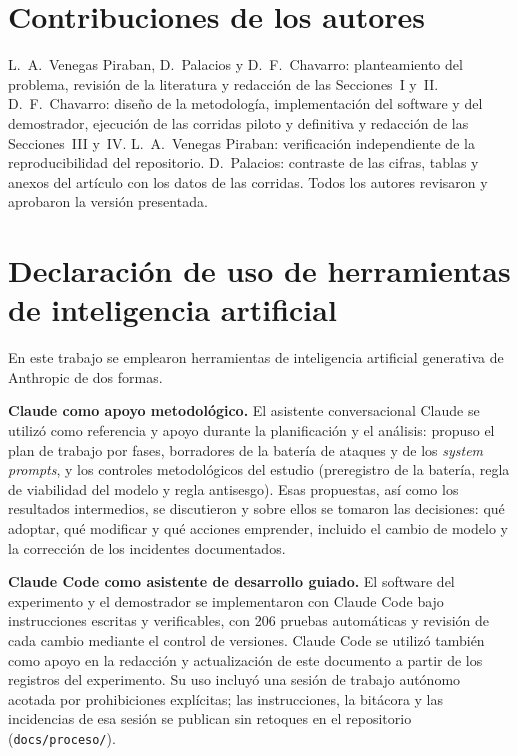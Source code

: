 \documentclass[twocolumn]{article}
\begin{document}
\section*{Contribuciones de los autores}
L.~A.~Venegas Piraban, D.~Palacios y D.~F.~Chavarro: planteamiento del problema,
revisión de la literatura y redacción de las Secciones~I y~II. D.~F.~Chavarro:
diseño de la metodología, implementación del software y del demostrador,
ejecución de las corridas piloto y definitiva y redacción de las Secciones~III
y~IV. L.~A.~Venegas Piraban: verificación independiente de la reproducibilidad
del repositorio. D.~Palacios: contraste de las cifras, tablas y anexos del
artículo con los datos de las corridas. Todos los autores revisaron y aprobaron
la versión presentada.

\section*{Declaración de uso de herramientas de inteligencia artificial}

En este trabajo se emplearon herramientas de inteligencia artificial generativa
de Anthropic de dos formas.

\textbf{Claude como apoyo metodológico.} El asistente conversacional Claude se
utilizó como referencia y apoyo durante la planificación y el análisis: propuso
el plan de trabajo por fases, borradores de la batería de ataques y de los
\textit{system prompts}, y los controles metodológicos del estudio (preregistro
de la batería, regla de viabilidad del modelo y regla antisesgo). Esas
propuestas, así como los resultados intermedios, se discutieron y sobre ellos se
tomaron las decisiones: qué adoptar, qué modificar y qué acciones emprender,
incluido el cambio de modelo y la corrección de los incidentes documentados.

\textbf{Claude Code como asistente de desarrollo guiado.} El software del
experimento y el demostrador se implementaron con Claude Code bajo instrucciones
escritas y verificables, con 206 pruebas automáticas y revisión de cada cambio
mediante el control de versiones. Claude Code se utilizó también como apoyo en
la redacción y actualización de este documento a partir de los registros del
experimento. Su uso incluyó una sesión de trabajo autónomo acotada por
prohibiciones explícitas; las instrucciones, la bitácora y las incidencias de esa
sesión se publican sin retoques en el repositorio (\texttt{docs/proceso/}).
\end{document}
